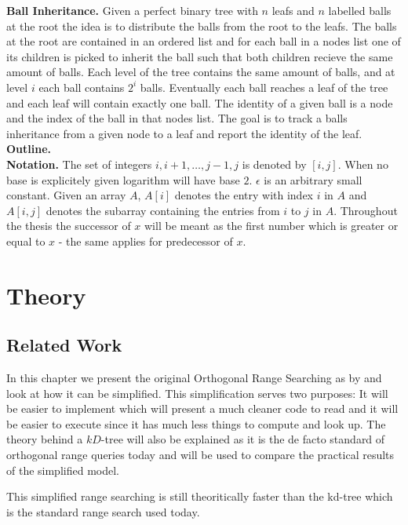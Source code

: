 \documentclass[twoside,11pt,openright]{report}
\begin{document}
\noindent \textbf{Ball Inheritance.} Given a perfect binary tree with $n$ leafs and $n$ labelled balls at the root the idea is to distribute the balls from the root to the leafs. The balls at the root are contained in an ordered list and for each ball in a nodes list one of its children is picked to inherit the ball such that both children recieve the same amount of balls. Each level of the tree contains the same amount of balls, and at level $i$ each ball contains $2^i$ balls. Eventually each ball reaches a leaf of the tree and each leaf will contain exactly one ball. The identity of a given ball is a node and the index of the ball in that nodes list. The goal is to track a balls inheritance from a given node to a leaf and report the identity of the leaf. \\


\noindent \textbf{Outline.} \\

\noindent \textbf{Notation.} The set of integers ${i, i+1, \dots, j-1, j}$ is denoted by $[i,j]$. When no base is explicitely given logarithm will have base $2$. $\epsilon$ is an arbitrary small constant. Given an array $A$, $A[i]$ denotes the entry with index $i$ in $A$ and $A[i,j]$ denotes the subarray containing the entries from $i$ to $j$ in $A$. Throughout the thesis the successor of $x$ will be meant as the first number which is greater or equal to $x$ - the same applies for predecessor of $x$.


\part{Theory}
\chapter{Related Work}

In this chapter we present the original Orthogonal Range Searching as by \citet{chanetal} and look at how it can be simplified. This simplification serves two purposes: It will be easier to implement which will present a much cleaner code to read and it will be easier to execute since it has much less things to compute and look up. The theory behind a $kD$-tree will also be explained as it is the de facto standard of orthogonal range queries today and will be used to compare the practical results of the simplified model.

This simplified range searching is still theoritically faster than the kd-tree which is the standard range search used today. 
\end{document}
